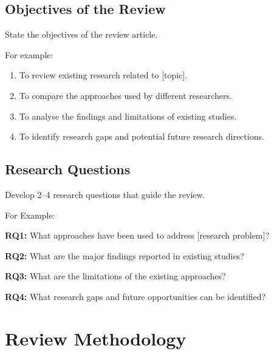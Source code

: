 \documentclass[12pt,a4paper]{article}
\begin{document}
\begin{justify}
\subsection{Objectives of the Review}

State the objectives of the review article.

\vspace{0.5cm}
For example:

\begin{enumerate}
    \item To review existing research related to [topic].
    \item To compare the approaches used by different researchers.
    \item To analyse the findings and limitations of existing studies.
    \item To identify research gaps and potential future research directions.
\end{enumerate}


\subsection{Research Questions}

Develop 2--4 research questions that guide the review.

\vspace{0.2cm}

For Example:


\textbf{RQ1:} What approaches have been used to address [research problem]?

\vspace{0.2cm}

\textbf{RQ2:} What are the major findings reported in existing studies?

\vspace{0.2cm}

\textbf{RQ3:} What are the limitations of the existing approaches?

\vspace{0.2cm}

\textbf{RQ4:} What research gaps and future opportunities can be identified?



\section{Review Methodology}


\end{justify}
\end{document}
